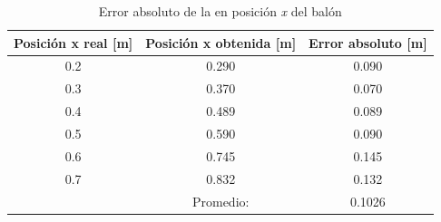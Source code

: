 \begin{table}[]
\begin{tabular}{|c|c|c|}
\hline
\multicolumn{1}{|l|}{\textbf{Posición x real {[}m{]}}} & \multicolumn{1}{l|}{\textbf{Posición x obtenida {[}m{]}}} & \multicolumn{1}{l|}{\textbf{Error absoluto [m]}} \\ \hline
0.2                                                    & 0.290                                                     & 0.090                                        \\ \hline
0.3                                                    & 0.370                                                     & 0.070                                        \\ \hline
0.4                                                    & 0.489                                                     & 0.089                                        \\ \hline
0.5                                                    & 0.590                                                     & 0.090                                        \\ \hline
0.6                                                    & 0.745                                                     & 0.145                                        \\ \hline
0.7                                                    & 0.832                                                     & 0.132                                        \\ \hline
                                                       & Promedio:                                                 & 0.1026                                       \\ \hline
\end{tabular}
\caption{Error absoluto de la en posición \textit{x} del balón}
\label{cuadro:x_position}
\end{table}


